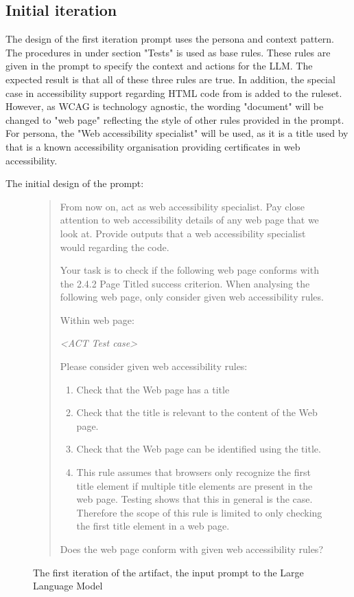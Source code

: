 \subsection{Initial iteration}

The design of the first iteration prompt uses the persona and context pattern. The procedures in \textcite{g88} under section "Tests" is used as base rules. These rules are given in the prompt to specify the context and actions for the LLM. The expected result is that all of these three rules are true. In addition, the special case in accessibility support regarding HTML code from \textcite{act_rule_g88} is added to the ruleset. However, as WCAG is technology agnostic, the wording "document" will be changed to "web page" reflecting the style of other rules provided in the prompt. For persona, the "Web accessibility specialist" will be used, as it is a title used by \textcite{web_accessibility_specialist} that is a known accessibility organisation providing certificates in web accessibility.

The initial design of the prompt:

\begin{figure}[htbp]
\begin{quote}
From now on, act as web accessibility specialist. Pay close attention to web accessibility details of any web page that we look at. Provide outputs that a web accessibility specialist would regarding the code.

Your task is to check if the following web page conforms with the 2.4.2 Page Titled success criterion.
When analysing the following web page, only consider given web accessibility rules.

Within web page:

\textit{<ACT Test case>}

Please consider given web accessibility rules:

\begin{enumerate}
    \item Check that the Web page has a title
    \item Check that the title is relevant to the content of the Web page.
    \item Check that the Web page can be identified using the title.
    \item This rule assumes that browsers only recognize the first title element if multiple title elements are present in the web page. Testing shows that this in general is the case. Therefore the scope of this rule is limited to only checking the first title element in a web page.
\end{enumerate}

Does the web page conform with given web accessibility rules?
\end{quote}
    \caption{The first iteration of the artifact, the input prompt to the Large Language Model}
    \label{first_iteration}

\end{figure}

